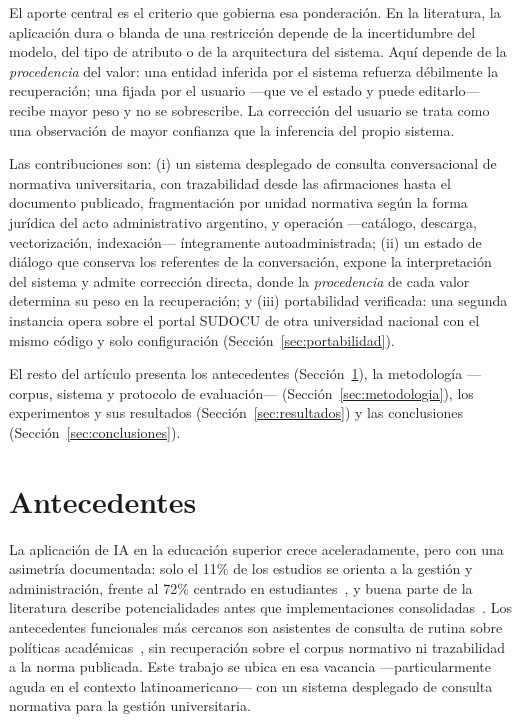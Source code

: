 \documentclass{llncs}
\begin{document}
El aporte central es el criterio que gobierna esa ponderación. En la literatura,
la aplicación dura o blanda de una restricción depende de la incertidumbre del
modelo, del tipo de atributo o de la arquitectura del sistema. Aquí depende de la
\emph{procedencia} del valor: una entidad inferida por el sistema refuerza
débilmente la recuperación; una fijada por el usuario ---que ve el estado y
puede editarlo--- recibe mayor peso y no se sobrescribe. La corrección del
usuario se trata como una observación de mayor confianza que la inferencia del
propio sistema.

Las contribuciones son: (i) un sistema desplegado de consulta conversacional de
normativa universitaria, con trazabilidad desde las afirmaciones hasta el
documento publicado, fragmentación por unidad normativa según la forma
jurídica del acto administrativo argentino, y operación
---catálogo, descarga, vectorización, indexación--- íntegramente
autoadministrada; (ii) un estado de diálogo que
conserva los referentes de la conversación, expone la interpretación del
sistema y admite corrección directa, donde la \emph{procedencia} de cada valor
determina su peso en la recuperación; y (iii)
portabilidad verificada: una segunda instancia opera sobre el portal SUDOCU de
otra universidad nacional con el mismo código y solo configuración
(Sección~\ref{sec:portabilidad}).

El resto del artículo presenta los antecedentes
(Sección~\ref{sec:relacionado}), la metodología ---corpus, sistema y protocolo
de evaluación--- (Sección~\ref{sec:metodologia}), los experimentos y sus
resultados (Sección~\ref{sec:resultados}) y las conclusiones
(Sección~\ref{sec:conclusiones}).

\section{Antecedentes}
\label{sec:relacionado}

La aplicación de IA en la educación superior crece aceleradamente, pero con
una asimetría documentada: solo el 11\% de los estudios se orienta a la
gestión y administración, frente al 72\% centrado en
estudiantes~\cite{crompton2023state}, y buena parte de la literatura describe
potencialidades antes que implementaciones
consolidadas~\cite{george2023managing}. Los antecedentes funcionales más
cercanos son asistentes de consulta de rutina sobre políticas
académicas~\cite{pang2025exploring}, sin recuperación sobre el corpus
normativo ni trazabilidad a la norma publicada. Este trabajo se ubica en esa
vacancia ---particularmente aguda en el contexto latinoamericano--- con un
sistema desplegado de consulta normativa para la gestión universitaria.
\end{document}
